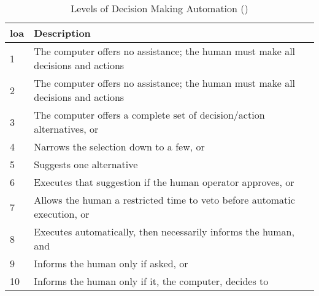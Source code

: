\begin{table}\centering
  \caption[Levels of Decision Making Automation]{Levels of Decision Making Automation (\citet{Sheridan1978})}
  \label{tab:autonomy_levels_sheridan}
  \begin{tabularx}{\textwidth}{p{1cm} X}\toprule
    \acrshort{loa} & Description \\ \midrule
    1&    The computer offers no assistance; the human must make all decisions and actions\\
    2&    The computer offers no assistance; the human must make all decisions and actions\\
    3&    The computer offers a complete set of decision/action alternatives, or\\
    4&    Narrows the selection down to a few, or\\
    5&    Suggests one alternative\\
    6&    Executes that suggestion if the human operator approves, or\\
    7&    Allows the human a restricted time to veto before automatic execution, or\\
    8&    Executes automatically, then necessarily informs the human, and\\
    9&    Informs the human only if asked, or\\
    10&    Informs the human only if it, the computer, decides to\\\bottomrule
  \end{tabularx}
\end{table}

